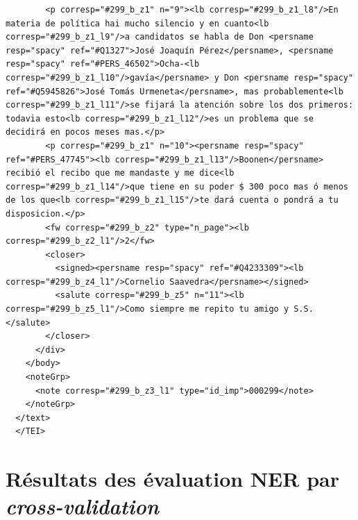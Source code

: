\begin{verbatim}
        <p corresp="#299_b_z1" n="9"><lb corresp="#299_b_z1_l8"/>En materia de política hai mucho silencio y en cuanto<lb corresp="#299_b_z1_l9"/>a candidatos se habla de Don <persname resp="spacy" ref="#Q1327">José Joaquín Pérez</persname>, <persname resp="spacy" ref="#PERS_46502">Ocha-<lb corresp="#299_b_z1_l10"/>gavía</persname> y Don <persname resp="spacy" ref="#Q5945826">José Tomás Urmeneta</persname>, mas probablemente<lb corresp="#299_b_z1_l11"/>se fijará la atención sobre los dos primeros: todavia esto<lb corresp="#299_b_z1_l12"/>es un problema que se decidirá en pocos meses mas.</p>
        <p corresp="#299_b_z1" n="10"><persname resp="spacy" ref="#PERS_47745"><lb corresp="#299_b_z1_l13"/>Boonen</persname> recibió el recibo que me mandaste y me dice<lb corresp="#299_b_z1_l14"/>que tiene en su poder $ 300 poco mas ó menos de los que<lb corresp="#299_b_z1_l15"/>te dará cuenta o pondrá a tu disposicion.</p>
        <fw corresp="#299_b_z2" type="n_page"><lb corresp="#299_b_z2_l1"/>2</fw>
        <closer>
          <signed><persname resp="spacy" ref="#Q4233309"><lb corresp="#299_b_z4_l1"/>Cornelio Saavedra</persname></signed>
          <salute corresp="#299_b_z5" n="11"><lb corresp="#299_b_z5_l1"/>Como siempre me repito tu amigo y S.S.</salute>
        </closer>
      </div>
    </body>
    <noteGrp>
      <note corresp="#299_b_z3_l1" type="id_imp">000299</note>
    </noteGrp>
  </text>
  </TEI>
\end{verbatim}

\chapter{Résultats des évaluation NER par \textit{cross-validation}}

